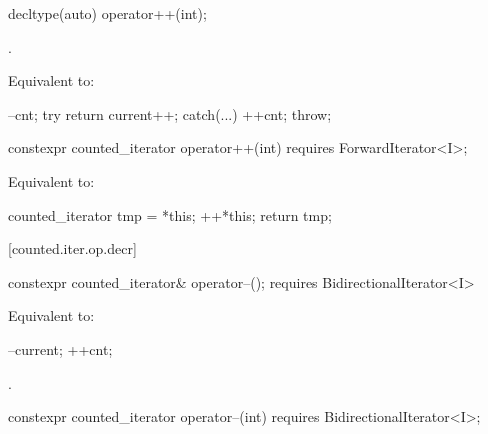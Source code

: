 %
%
\begin{itemdecl}
decltype(auto) operator++(int);
\end{itemdecl}

\begin{itemdescr}
\pnum
\requires {}.

\pnum
\effects Equivalent to:
\begin{codeblock}
--cnt;
try { return current++; }
catch(...) { ++cnt; throw; }
\end{codeblock}
\end{itemdescr}

\begin{itemdecl}
constexpr counted_iterator operator++(int)
  requires ForwardIterator<I>;
\end{itemdecl}

\begin{itemdescr}
\pnum
\requires {}

\pnum
\effects Equivalent to:
\begin{codeblock}
counted_iterator tmp = *this;
++*this;
return tmp;
\end{codeblock}
\end{itemdescr}

[counted.iter.op.decr]{}

%
%
\begin{itemdecl}
  constexpr counted_iterator& operator--();
    requires BidirectionalIterator<I>
\end{itemdecl}

\begin{itemdescr}
\pnum
\effects Equivalent to:
\begin{codeblock}
--current;
++cnt;
\end{codeblock}

\pnum
\returns {}.
\end{itemdescr}

%
%
\begin{itemdecl}
  constexpr counted_iterator operator--(int)
    requires BidirectionalIterator<I>;
\end{itemdecl}

